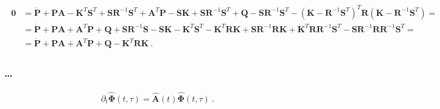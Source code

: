 \documentclass[letterpaper,10pt,english]{jupyterBook}
\begin{document}
\begin{equation*}
\begin{split}\begin{aligned}
 \mathbf{0} 
  & = \dot{\mathbf{P}} + \mathbf{P} \mathbf{A} - \mathbf{K}^T \mathbf{S}^T + \mathbf{S} \mathbf{R}^{-1} \mathbf{S}^T + \mathbf{A}^T \mathbf{P} - \mathbf{S} \mathbf{K} + \mathbf{S} \mathbf{R}^{-1} \mathbf{S}^T + \mathbf{Q} - \mathbf{S} \mathbf{R}^{-1} \mathbf{S}^T - \left( \mathbf{K} - \mathbf{R}^{-1} \mathbf{S}^T \right)^T \mathbf{R} \left( \mathbf{K} - \mathbf{R}^{-1} \mathbf{S}^T \right) = \\
  & = \dot{\mathbf{P}} + \mathbf{P} \mathbf{A} + \mathbf{A}^T \mathbf{P} + \mathbf{Q} + \mathbf{S}\mathbf{R}^{-1} \mathbf{S} - \mathbf{S} \mathbf{K} - \mathbf{K}^T \mathbf{S}^T - \mathbf{K}^T \mathbf{R} \mathbf{K} + \mathbf{S} \mathbf{R}^{-1} \mathbf{R} \mathbf{K} + \mathbf{K}^T \mathbf{R} \mathbf{R}^{-1} \mathbf{S}^T - \mathbf{S} \mathbf{R}^{-1} \mathbf{R} \mathbf{R}^{-1} \mathbf{S}^T = \\
  & = \dot{\mathbf{P}} + \mathbf{P} \mathbf{A} + \mathbf{A}^T \mathbf{P} + \mathbf{Q} - \mathbf{K}^T \mathbf{R} \mathbf{K} \ .
\end{aligned}\end{split}
\end{equation*}\subsubsection*{…}
\begin{equation*}
\begin{split}\partial_t \hat{\boldsymbol\Phi}(t,\tau) = \hat{\mathbf{A}}(t)  \hat{\boldsymbol\Phi}(t,\tau) \ .\end{split}
\end{equation*}


\sphinxstepscope
\end{document}
